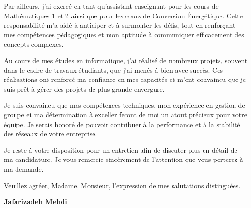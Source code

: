 \documentclass[11pt,a4paper]{letter}
\begin{document}
\vspace{0.3cm}

Par ailleurs, j'ai exercé en tant qu'assistant enseignant pour les cours de Mathématiques 1 et 2 ainsi que pour les cours de Conversion Énergétique. Cette responsabilité m'a aidé à anticiper et à surmonter les défis, tout en renforçant mes compétences pédagogiques et mon aptitude à communiquer efficacement des concepts complexes.

\vspace{0.3cm}

Au cours de mes études en informatique, j'ai réalisé de nombreux projets, souvent dans le cadre de travaux étudiants, que j'ai menés à bien avec succès. Ces réalisations ont renforcé ma confiance en mes capacités et m'ont convaincu que je suis prêt à gérer des projets de plus grande envergure.

\vspace{0.3cm}

Je suis convaincu que mes compétences techniques, mon expérience en gestion de groupe et ma détermination à exceller feront de moi un atout précieux pour votre équipe. Je serais honoré de pouvoir contribuer à la performance et à la stabilité des réseaux de votre entreprise.

\vspace{0.3cm}

Je reste à votre disposition pour un entretien afin de discuter plus en détail de ma candidature. Je vous remercie sincèrement de l'attention que vous porterez à ma demande.


\vspace{0.5cm}

\noindent Veuillez agréer, Madame, Monsieur, l'expression de mes salutations distinguées.

\vspace{1cm}

\noindent\textbf{Jafarizadeh Mehdi}
\end{document}
